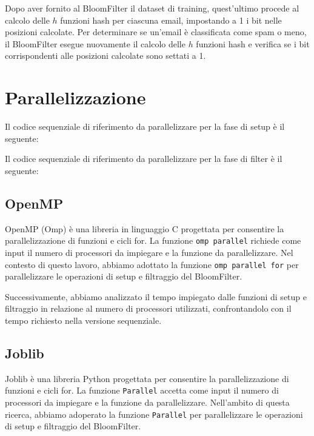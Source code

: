 \documentclass[11pt]{article}
\begin{document}
    Dopo aver fornito al BloomFilter il dataset di training, quest'ultimo procede al calcolo delle $h$ funzioni hash per ciascuna email,
    impostando a 1 i bit nelle posizioni calcolate.
    Per determinare se un'email è classificata come spam o meno, il BloomFilter esegue nuovamente il calcolo delle $h$
    funzioni hash e verifica se i bit corrispondenti alle posizioni calcolate sono settati a 1.

    \section{Parallelizzazione}\label{sec:parallelizazzione}
    Il codice sequenziale di riferimento da parallelizzare per la fase di setup è il seguente:
    
    

    Il codice sequenziale di riferimento da parallelizzare per la fase di filter è il seguente:
    
    

    \subsection{OpenMP}\label{subsec:omp}
    OpenMP (Omp) è una libreria in linguaggio C progettata per consentire la parallelizzazione di funzioni e cicli for.
    La funzione \texttt{omp parallel} richiede come input il numero di processori da impiegare e la funzione da parallelizzare.
    Nel contesto di questo lavoro, abbiamo adottato la funzione \texttt{omp parallel for} per parallelizzare le operazioni
    di setup e filtraggio del BloomFilter.

    Successivamente, abbiamo analizzato il tempo impiegato dalle funzioni di setup e filtraggio in relazione al numero
    di processori utilizzati, confrontandolo con il tempo richiesto nella versione sequenziale.
    

    \subsection{Joblib}\label{subsec:joblib}
    Joblib è una libreria Python progettata per consentire la parallelizzazione di funzioni e cicli for.
    La funzione \texttt{Parallel} accetta come input il numero di processori da impiegare e la funzione da parallelizzare.
    Nell'ambito di questa ricerca, abbiamo adoperato la funzione \texttt{Parallel} per parallelizzare le operazioni di setup
    e filtraggio del BloomFilter.
\end{document}
